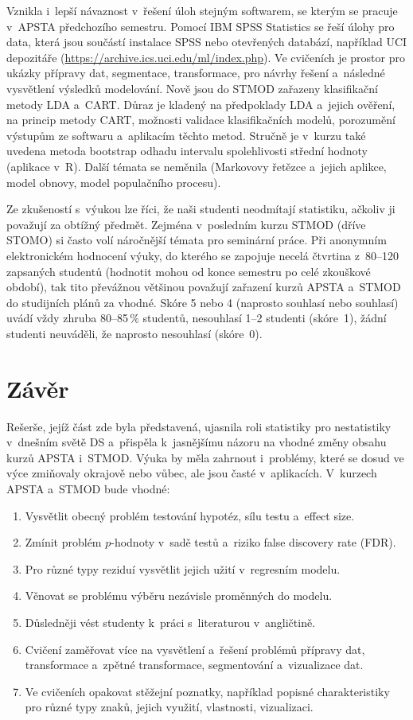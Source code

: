 Vznikla i~lepší návaznost v~řešení úloh stejným softwarem, se kterým se pracuje v~APSTA předchozího semestru. Pomocí IBM SPSS Statistics se řeší úlohy pro data, která jsou součástí instalace SPSS nebo otevřených databází, například UCI depozitáře (\url{https://archive.ics.uci.edu/ml/index.php}). Ve cvičeních je prostor pro ukázky přípravy dat, segmentace, transformace, pro návrhy řešení a~následné vysvětlení výsledků modelování. Nově jsou do STMOD  zařazeny klasifikační metody LDA a~CART. Důraz je kladený na předpoklady LDA a~jejich ověření, na princip metody CART, možnosti validace klasifikačních modelů, porozumění výstupům ze softwaru a~aplikacím těchto metod. Stručně je v~kurzu také uvedena metoda bootstrap odhadu intervalu spolehlivosti střední hodnoty (aplikace v~R). Další témata se neměnila (Markovovy řetězce a~jejich aplikce, model obnovy, model populačního procesu).

Ze zkušeností s~výukou lze říci, že naši studenti neodmítají statistiku, ačkoliv ji považují za obtížný předmět. Zejména v~posledním kurzu STMOD (dříve STOMO) si často volí náročnější témata pro seminární práce. Při anonymním elektronickém hodnocení výuky, do kterého se zapojuje necelá čtvrtina z~80--120 zapsaných studentů (hodnotit mohou od konce semestru po celé zkouškové období), tak tito převážnou většinou považují zařazení kurzů APSTA a~STMOD do studijních plánů za vhodné. Skóre 5 nebo 4 (naprosto souhlasí nebo souhlasí) uvádí vždy zhruba 80--85\,$\% $ studentů, nesouhlasí 1--2 studenti (skóre~1), žádní studenti neuváděli, že naprosto nesouhlasí (skóre~0). 


\section{Závěr}
Rešerše, jejíž část zde byla představená, ujasnila roli statistiky pro nestatistiky v~dnešním světě DS a~přispěla k~jasnějšímu názoru na vhodné změny obsahu kurzů APSTA i~STMOD. Výuka by měla zahrnout i~problémy, které se dosud ve výce zmiňovaly okrajově nebo vůbec, ale jsou časté v~aplikacích. V~kurzech APSTA a~STMOD bude vhodné:
\begin{enumerate}
\itemsep=-1pt
\item Vysvětlit obecný problém testování hypotéz, sílu testu a~effect size.
\item Zmínit problém $p$-hodnoty v~sadě testů a~riziko false discovery rate (FDR).
\item Pro různé typy reziduí vysvětlit jejich užití v~regresním modelu.
\item Věnovat se problému výběru nezávisle proměnných do modelu.
\item Důsledněji vést studenty k~práci s~literaturou v~angličtině.
\item Cvičení zaměřovat více na vysvětlení a~řešení problémů přípravy dat, transformace a~zpětné transformace, segmentování a~vizualizace dat.
\item Ve cvičeních opakovat stěžejní poznatky, například popisné charakteristiky pro různé typy znaků, jejich využití, vlastnosti, vizualizaci.
\end{enumerate}

